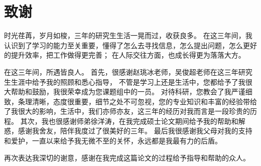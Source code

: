 \chapter*{致谢}
时光荏苒，岁月如梭，三年的研究生生活一晃而过，收获良多。
在这三年间，我认识到了学习的能力至关重要，懂得了怎么去寻找信息，怎么提出问题，怎么更好的提升效率，把工作做得更完善；
在人际交往方面，也成长得更为落落大方。\par
在这三年间，所遇皆良人。
首先，很感谢赵珧冰老师，吴俊超老师在这三年研究生生涯中给予我的照顾和悉心指导，
不管是学习上还是生活中，您都给予了我很大帮助和鼓励，我很荣幸成为您课题组中的一员。
对待科研，您教会了我严谨细致，条理清晰，态度很重要，细节之处不可忽视，您的专业知识和丰富的经验带给了我很大的影响，生活中，我们亦师亦友，这三年的经历对我而言是一段珍贵的历程。
其次，我也很感谢师弟徐洋涛，在我完成硕士论文期间给予我的帮助和解惑，感谢我舍友，陪伴我度过了很美好的三年。
最后我很感谢我父母对我的支持和爱护，一直以来给予我无微不至的关怀，永远都是我最有力的后盾。\par
再次表达我深切的谢意，感谢在我完成这篇论文的过程给予指导和帮助的众人。
